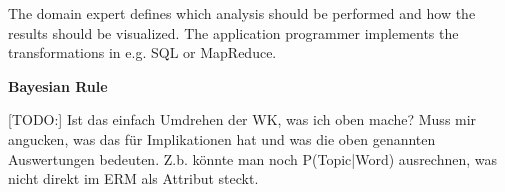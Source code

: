 The domain expert defines which analysis should be performed and how the results should be visualized. The application programmer implements the transformations in e.g. SQL or MapReduce.

\textbf{Bayesian Rule}

[TODO:] Ist das einfach Umdrehen der WK, was ich oben mache? Muss mir angucken, was das für Implikationen hat und was die oben genannten Auswertungen bedeuten. Z.b. könnte man noch P(Topic|Word) ausrechnen, was nicht direkt im ERM als Attribut steckt.
